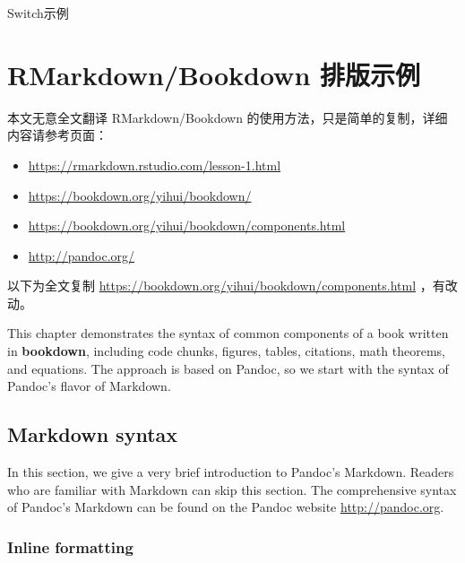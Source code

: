\documentclass[doctor,openright,twoside]{sjtuthesis}
\providecommand{\tightlist}{%
    \setlength{\itemsep}{0pt}\setlength{\parskip}{0pt}}
\theoremstyle{plain}
\theoremstyle{definition}
\theoremstyle{remark}
\theoremstyle{ocrenumbox}
\theoremstyle{plain}
\begin{document}
\begin{algorithm}
\caption{Switch示例}
\label{algo:switch_example}
\begin{algorithmic}[1]
    \EndCase
    \EndCase
    \Default
    \EndDefault
  \EndSwitch
\end{algorithmic}
\end{algorithm}

\hypertarget{chap:rmarkdown}{%
\chapter{RMarkdown/Bookdown 排版示例}\label{chap:rmarkdown}}

本文无意全文翻译 RMarkdown/Bookdown 的使用方法，只是简单的复制，详细内容请参考页面：

\begin{itemize}
\tightlist
\item
  \url{https://rmarkdown.rstudio.com/lesson-1.html}
\item
  \url{https://bookdown.org/yihui/bookdown/}
\item
  \url{https://bookdown.org/yihui/bookdown/components.html}
\item
  \url{http://pandoc.org/}
\end{itemize}

以下为全文复制 \url{https://bookdown.org/yihui/bookdown/components.html} ，有改动。

This chapter demonstrates the syntax of common components of a book written in \textbf{bookdown}, including code chunks, figures, tables, citations, math theorems, and equations. The approach is based on Pandoc, so we start with the syntax of Pandoc's flavor of Markdown.

\hypertarget{markdown-syntax}{%
\section{Markdown syntax}\label{markdown-syntax}}

In this section, we give a very brief introduction to Pandoc's Markdown. Readers who are familiar with Markdown can skip this section. The comprehensive syntax of Pandoc's Markdown can be found on the Pandoc website \url{http://pandoc.org}.

\hypertarget{inline-formatting}{%
\subsection{Inline formatting}\label{inline-formatting}}
\end{document}
